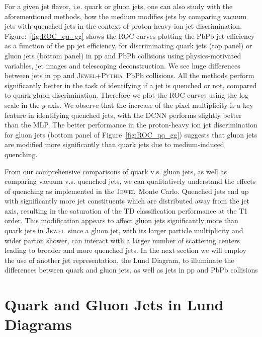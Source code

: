 \documentclass[notoc]{JHEP3}
\newcommand{\jw}{\textsc{Jewel}~}
\newcommand{\jwpy}{\textsc{Jewel+Pythia}~}
\begin{document}
For a given jet flavor, i.e. quark or gluon jets, one can also study with the aforementioned methods, how the medium modifies jets by comparing vacuum jets with quenched jets in the context of proton-heavy ion jet discrimination. Figure:~\ref{fig:ROC_qq_gg} shows the ROC curves plotting the PbPb jet efficiency as a function of the pp jet efficiency, for discriminating quark jets (top panel) or gluon jets (bottom panel) in pp and PbPb collisions using physics-motivated variables, jet images and telescoping deconstruction. We see huge differences between jets in pp and \jwpy PbPb collisions. All the methods perform significantly better in the task of identifying if a jet is quenched or not, compared to quark gluon discrimination. Therefore we plot the ROC curves using the log scale in the $y$-axis. We observe that the increase of the pixel multiplicity is a key feature in identifying quenched jets, with the DCNN performs slightly better than the MLP. The better performance in the proton-heavy ion jet discrimination for gluon jets (bottom panel of Figure~\ref{fig:ROC_qq_gg}) suggests that gluon jets are modified more significantly than quark jets due to medium-induced quenching.

From our comprehensive comparisons of quark v.s. gluon jets, as well as comparing vacuum v.s. quenched jets, we can qualitatively understand the effects of quenching as implemented in the \jw Monte Carlo. Quenched jets end up with significantly more jet constituents which are distributed away from the jet axis, resulting in the saturation of the TD classification performance at the T1 order. This modification appears to affect gluon jets significantly more than quark jets in \jw since a gluon jet, with its larger particle multiplicity and wider parton shower, can interact with a larger number of scattering centers leading to broader and more quenched jets. In the next section we will employ the use of another jet representation, the Lund Diagram, to illuminate the differences between quark and gluon jets, as well as jets in pp and PbPb collisions

\section{Quark and Gluon Jets in Lund Diagrams}
\label{sec:lund}
\end{document}
